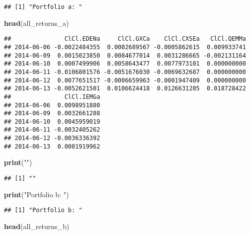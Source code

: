 \documentclass[]{article}
\newenvironment{Shaded}{\begin{snugshade}}{\end{snugshade}}
\newcommand{\KeywordTok}[1]{\textcolor[rgb]{0.13,0.29,0.53}{\textbf{#1}}}
\newcommand{\NormalTok}[1]{#1}
\newcommand{\StringTok}[1]{\textcolor[rgb]{0.31,0.60,0.02}{#1}}
\begin{document}
\begin{verbatim}
## [1] "Portfolio a: "
\end{verbatim}

\begin{Shaded}
\begin{Highlighting}[]
\KeywordTok{head}\NormalTok{(all_returns_a)}
\end{Highlighting}
\end{Shaded}

\begin{verbatim}
##               ClCl.EDENa     ClCl.GXCa    ClCl.CXSEa   ClCl.QEMMa
## 2014-06-06 -0.0022484355  0.0002689567 -0.0005862615  0.009933741
## 2014-06-09  0.0015023850  0.0084677014  0.0031286665 -0.002131164
## 2014-06-10  0.0007499906  0.0058643477  0.0077973101  0.000000000
## 2014-06-11 -0.0106801576 -0.0051676030 -0.0069632687  0.000000000
## 2014-06-12  0.0077651517 -0.0006659963 -0.0001947409  0.000000000
## 2014-06-13 -0.0052621501  0.0106624418  0.0126631205  0.018728422
##               ClCl.IEMGa
## 2014-06-06  0.0098951880
## 2014-06-09  0.0032661288
## 2014-06-10  0.0045959019
## 2014-06-11 -0.0032405262
## 2014-06-12 -0.0036336392
## 2014-06-13  0.0001919962
\end{verbatim}

\begin{Shaded}
\begin{Highlighting}[]
\KeywordTok{print}\NormalTok{(}\StringTok{""}\NormalTok{)}
\end{Highlighting}
\end{Shaded}

\begin{verbatim}
## [1] ""
\end{verbatim}

\begin{Shaded}
\begin{Highlighting}[]
\KeywordTok{print}\NormalTok{(}\StringTok{"Portfolio b: "}\NormalTok{)}
\end{Highlighting}
\end{Shaded}

\begin{verbatim}
## [1] "Portfolio b: "
\end{verbatim}

\begin{Shaded}
\begin{Highlighting}[]
\KeywordTok{head}\NormalTok{(all_returns_b)}
\end{Highlighting}
\end{Shaded}
\end{document}
